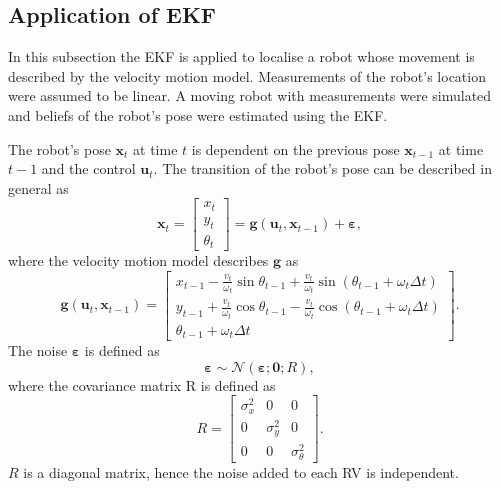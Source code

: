 \documentclass[12pt,oneside,openany,a4paper, %
afrikaans,english,
]{memoir}
\numberwithin{equation}{chapter}
\begin{document}
\subsection{Application of EKF}
In this subsection the EKF is applied to localise a robot whose movement is described by the velocity motion model. Measurements of the robot's location were assumed to be linear. A moving robot with measurements were simulated and beliefs of the robot's pose were estimated using the EKF.

The robot's pose $\bm{x}_t$ at time $t$ is dependent on the previous pose $\bm{x}_{t-1}$ at time $t-1$ and the control $\bm{u}_t$. The transition of the robot's pose can be described in general as
\begin{equation}
\bm{x}_t =
\begin{bmatrix}
x_t\\
y_t\\
\theta_t
\end{bmatrix}
= \bm{g}(\bm{u}_t, \bm{x}_{t-1}) + \bm{\varepsilon},
\end{equation}
where the velocity motion model describes $\bm{g}$ as
\begin{equation}
\bm{g}(\bm{u}_t, \bm{x}_{t-1})=
\begin{bmatrix}
x_{t-1} - \frac{v_t}{\omega_t} \sin\theta_{t-1} + \frac{v_t}{\omega_t} \sin(\theta_{t-1} + \omega_t \Delta t)\\
y_{t-1} + \frac{v_t}{\omega_t} \cos\theta_{t-1} - \frac{v_t}{\omega_t} \cos(\theta_{t-1} + \omega_t \Delta t)\\
\theta_{t-1} + \omega_t \Delta t
\end{bmatrix}.
\end{equation}
The noise $\bm{\varepsilon}$ is defined as
\begin{equation}
\bm{\varepsilon} \sim \mathcal{N}(\bm{\varepsilon}; \bm{0}; R),
\end{equation}
where the covariance matrix R is defined as
\begin{equation}
R =
\begin{bmatrix}
\sigma_x^2 & 0 & 0\\
0 & \sigma_y^2 & 0\\
0 & 0 & \sigma_\theta^2
\end{bmatrix}.
\end{equation}
$R$ is a diagonal matrix, hence the noise added to each RV is independent.
\end{document}
